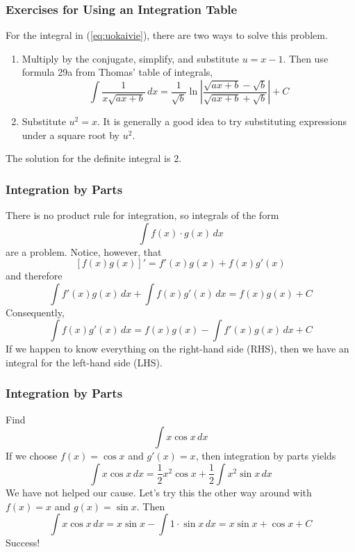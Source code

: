 \documentclass[xcolor=dvipsnames]{beamer}
\begin{document}
\begin{frame}
  \frametitle{Exercises for Using an Integration Table}
For the integral in (\ref{eq:uokaivie}), there are two ways to solve
this problem.
\begin{enumerate}
\item Multiply by the conjugate, simplify, and substitute $u=x-1$.
  Then use formula 29a from Thomas' table of integrals,
  \begin{equation}
    \label{eq:taxeepei}
    \int\frac{1}{x\sqrt{ax+b}}\,dx=\frac{1}{\sqrt{b}}\ln\left\vert\frac{\sqrt{ax+b}-\sqrt{b}}{\sqrt{ax+b}+\sqrt{b}}\right\vert+C
  \end{equation}
\item Substitute $u^{2}=x$. It is generally a good idea to try
  substituting expressions under a square root by $u^{2}$.
\end{enumerate}
The solution for the definite integral is $2$.
\end{frame}

\begin{frame}
  \frametitle{Integration by Parts}
  There is no product rule for integration, so integrals of the form
  \begin{equation}
    \label{eq:auzoowoo}
    \int{}f(x)\cdot{}g(x)\,dx
  \end{equation}
are a problem. Notice, however, that
\begin{equation}
  \label{eq:vieyaigh}
  \left[f(x)g(x)\right]'=f'(x)g(x)+f(x)g'(x)
\end{equation}
and therefore
\begin{equation}
  \label{eq:aiphithe}
  \int{}f'(x)g(x)\,dx+\int{}f(x)g'(x)\,dx=f(x)g(x)+C
\end{equation}
Consequently,
\begin{equation}
  \label{eq:taebohme}
  \int{}f(x)g'(x)\,dx=f(x)g(x)-\int{}f'(x)g(x)\,dx+C
\end{equation}
If we happen to know everything on the right-hand side (RHS), then we
have an integral for the left-hand side (LHS).
\end{frame}

\begin{frame}
  \frametitle{Integration by Parts}
   Find
  \begin{equation}
    \label{eq:eecahquo}
    \int{}x\cos{}x\,dx
  \end{equation}
If we choose $f(x)=\cos{}x$ and $g'(x)=x$, then integration by parts
yields
\begin{equation}
  \label{eq:aebashiy}
  \int{}x\cos{}x\,dx=\frac{1}{2}x^{2}\cos{}x+\frac{1}{2}\int{}x^{2}\sin{}x\,dx
\end{equation}
We have not helped our cause. Let's try this the other way around with
$f(x)=x$ and $g(x)=\sin{}x$. Then
\begin{equation}
  \label{eq:oiwuilah}
  \int{}x\cos{}x\,dx=x\sin{}x-\int{}1\cdot\sin{}x\,dx=x\sin{}x+\cos{}x+C
\end{equation}
Success!
\end{frame}
\end{document}
